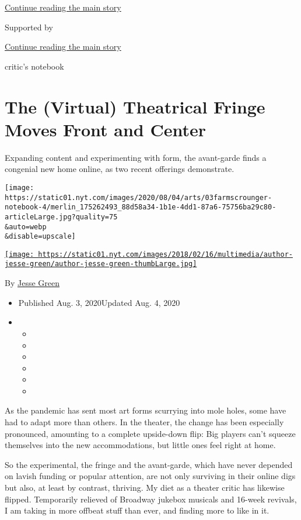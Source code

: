 \protect\hyperlink{after-top}{Continue reading the main story}

Supported by

\protect\hyperlink{after-sponsor}{Continue reading the main story}

critic's notebook

\hypertarget{the-virtual-theatrical-fringe-moves-front-and-center}{%
\section{The (Virtual) Theatrical Fringe Moves Front and
Center}\label{the-virtual-theatrical-fringe-moves-front-and-center}}

Expanding content and experimenting with form, the avant-garde finds a
congenial new home online, as two recent offerings demonstrate.

\texttt{[image: https://static01.nyt.com/images/2020/08/04/arts/03farmscrounger-notebook-4/merlin\_175262493\_88d58a34-1b1e-4dd1-87a6-75756ba29c80-articleLarge.jpg?quality=75\\\&auto=webp\\\&disable=upscale]}

\href{https://www.nytimes.com/by/jesse-green}{\texttt{[image: https://static01.nyt.com/images/2018/02/16/multimedia/author-jesse-green/author-jesse-green-thumbLarge.jpg]}}

By \href{https://www.nytimes.com/by/jesse-green}{Jesse Green}

\begin{itemize}
\item
  Published Aug. 3, 2020Updated Aug. 4, 2020
\item
  \begin{itemize}
  \item
  \item
  \item
  \item
  \item
  \item
  \end{itemize}
\end{itemize}

As the pandemic has sent most art forms scurrying into mole holes, some
have had to adapt more than others. In the theater, the change has been
especially pronounced, amounting to a complete upside-down flip: Big
players can't squeeze themselves into the new accommodations, but little
ones feel right at home.

So the experimental, the fringe and the avant-garde, which have never
depended on lavish funding or popular attention, are not only surviving
in their online digs but also, at least by contrast, thriving. My diet
as a theater critic has likewise flipped. Temporarily relieved of
Broadway jukebox musicals and 16-week revivals, I am taking in more
offbeat stuff than ever, and finding more to like in it.

